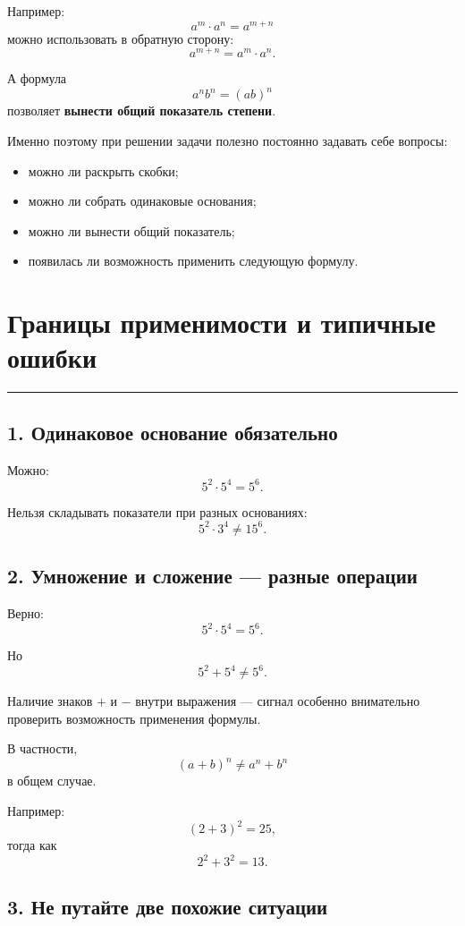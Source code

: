 \documentclass[a4paper,12pt]{article}
\newcommand{\lessonrule}{%
  \par\vspace{0.3em}
  {\color{accent}\rule{\linewidth}{0.6pt}}
  \vspace{0.5em}
}
\newcommand{\important}[1]{\textbf{\color{darkaccent}#1}}
\begin{document}
Например:
\[
a^m\cdot a^n=a^{m+n}
\]
можно использовать в обратную сторону:
\[
a^{m+n}=a^m\cdot a^n.
\]

А формула
\[
a^n b^n=(ab)^n
\]
позволяет \important{вынести общий показатель степени}.

Именно поэтому при решении задачи полезно постоянно задавать себе вопросы:

\begin{itemize}
  \item можно ли раскрыть скобки;
  \item можно ли собрать одинаковые основания;
  \item можно ли вынести общий показатель;
  \item появилась ли возможность применить следующую формулу.
\end{itemize}

\section*{\color{darkaccent}Границы применимости и типичные ошибки}
\lessonrule

\subsection*{\color{accent}1. Одинаковое основание обязательно}

Можно:
\[
5^2\cdot5^4=5^6.
\]

Нельзя складывать показатели при разных основаниях:
\[
5^2\cdot3^4
\ne
15^6.
\]

\subsection*{\color{accent}2. Умножение и сложение --- разные операции}

Верно:
\[
5^2\cdot5^4=5^6.
\]

Но
\[
5^2+5^4
\ne
5^6.
\]

Наличие знаков \(+\) и \(-\) внутри выражения --- сигнал
особенно внимательно проверить возможность применения формулы.

В частности,
\[
(a+b)^n\ne a^n+b^n
\]
в общем случае.

Например:
\[
(2+3)^2=25,
\]
тогда как
\[
2^2+3^2=13.
\]

\subsection*{\color{accent}3. Не путайте две похожие ситуации}
\end{document}
